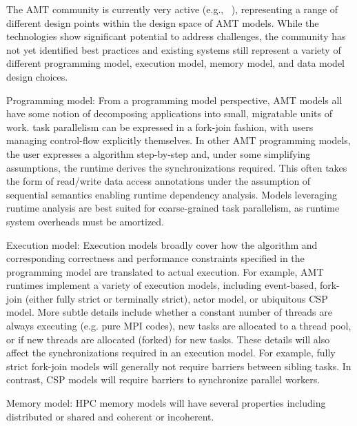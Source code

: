 The \gls{AMT} community is currently very active (e.g.,
~\cite{OCR,STAPL,Legion,Realm,StencilHPX,Charm++,Uintah,Loci,PARSEC,DaGuE,Cilk}),
representing a range of different design points within the
design space of \gls{AMT} models. While the technologies show significant
potential to address challenges, the community has not yet identified best
practices and existing systems still represent a variety of different \gls{programming model},
\gls{execution model}, \gls{memory model}, and \gls{data model} design choices.  

\begin{compactdesc}
\item[Programming model:]
From a \gls{programming model} perspective, \gls{AMT} models all have some
notion of decomposing applications into small, \gls{migratable} units of work. 
\Gls{task parallelism} can be expressed in a \gls{fork-join} fashion, with 
users managing control-flow explicitly themselves. 
In other \gls{AMT} \glspl{programming model}, the user expresses a 
algorithm step-by-step and, under some simplifying assumptions, the runtime derives the synchronizations required.
This often takes the form of read/write data access annotations under the
assumption of \gls{sequential semantics} enabling runtime dependency analysis.
Models leveraging runtime analysis are best suited for coarse-grained 
\gls{task parallelism}, as \gls{runtime system} overheads must be amortized.
\item[Execution model:]
  Execution models broadly cover how the algorithm and corresponding
  correctness and performance constraints specified in the \gls{programming
  model} are translated to actual execution.
  For example, \gls{AMT} runtimes implement a variety of \glspl{execution
  model}, including \gls{event-based}, \gls{fork-join} (either \gls{fully
  strict} or \gls{terminally strict}), \gls{actor model}, or ubiquitous
  \gls{CSP} model.  More subtle details include whether a constant number of
  threads are always executing (e.g. pure MPI codes), new tasks are allocated
  to a \gls{thread pool}, or if new threads are allocated (forked) for new tasks.
  These details will also affect the synchronizations required in an execution
  model. For example, fully strict \gls{fork-join} models will generally not
  require \glspl{barrier} between sibling tasks. In contrast, \gls{CSP} models
  will require \glspl{barrier} to synchronize parallel workers.
\item[Memory model:]
  \gls{HPC} \glspl{memory model} will have several properties including distributed or shared and coherent or incoherent. 

\end{compactdesc}
